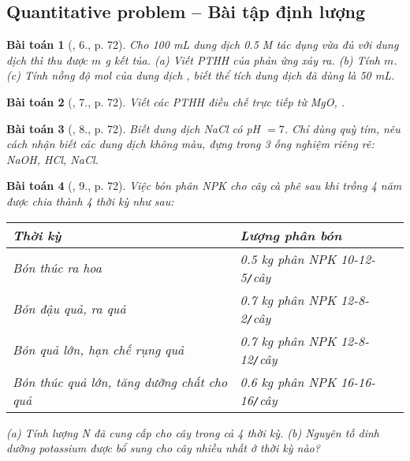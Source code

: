 \documentclass{article}
\newtheorem{baitoan}{Bài toán}
\begin{document}
\subsection{Quantitative problem -- Bài tập định lượng}

\begin{baitoan}[\cite{SGK_KHTN_8_Canh_Dieu}, 6., p. 72]
	Cho \emph{100 mL} dung dịch \emph{ 0.5 M} tác dụng vừa đủ với dung dịch \emph{} thì thu được $m$ \emph{g} kết tủa. (a) Viết PTHH của phản ứng xảy ra. (b) Tính $m$. (c) Tính nồng độ mol của dung dịch \emph{}, biết thể tích dung dịch \emph{} đã dùng là \emph{50 mL}.
\end{baitoan}

\begin{baitoan}[\cite{SGK_KHTN_8_Canh_Dieu}, 7., p. 72]
	Viết các PTHH điều chế \emph{} trực tiếp từ \emph{MgO, }.
\end{baitoan}

\begin{baitoan}[\cite{SGK_KHTN_8_Canh_Dieu}, 8., p. 72]
	Biết dung dịch \emph{NaCl} có \emph{pH $= 7$}. Chỉ dùng quỳ tím, nêu cách nhận biết các dung dịch không màu, đựng trong 3 ống nghiệm riêng rẽ: \emph{NaOH, HCl, NaCl}.
\end{baitoan}

\begin{baitoan}[\cite{SGK_KHTN_8_Canh_Dieu}, 9., p. 72]
	Việc bón phân NPK cho cây cà phê sau khi trồng 4 năm được chia thành 4 thời kỳ như sau:
	\begin{table}[H]
		\centering
		\begin{tabular}{|l|l|}
			\hline
			Thời kỳ & Lượng phân bón \\
			\hline
			Bón thúc ra hoa & 0.5 kg phân NPK 10-12-5\texttt{/}cây \\
			\hline
			Bón đậu quả, ra quả & 0.7 kg phân NPK 12-8-2\texttt{/}cây \\
			\hline
			Bón quả lớn, hạn chế rụng quả & 0.7 kg phân NPK 12-8-12\texttt{/}cây \\
			\hline
			Bón thúc quả lớn, tăng dưỡng chất cho quả & 0.6 kg phân NPK 16-16-16\texttt{/}cây \\
			\hline
		\end{tabular}
	\end{table}
	\noindent(a) Tính lượng \emph{N} đã cung cấp cho cây trong cả 4 thời kỳ. (b) Nguyên tố dinh dưỡng potassium được bổ sung cho cây nhiều nhất ở thời kỳ nào?
\end{baitoan}
\end{document}
